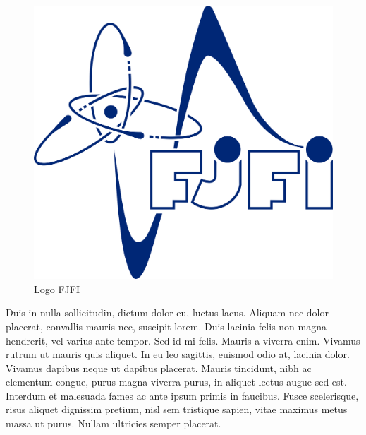 \documentclass{article}
\begin{document}
\begin{figure}[!htp]
	\begin{center}
		\includegraphics[scale=0.1]{logo-fjfi.png}
	\end{center}
	\caption{Logo FJFI}
	\label{fig:logo-fjfi}
\end{figure}

Duis in nulla sollicitudin, dictum dolor eu, luctus lacus. Aliquam nec dolor placerat, convallis mauris nec, suscipit lorem. Duis lacinia felis non magna hendrerit, vel varius ante tempor. Sed id mi felis. Mauris a viverra enim. Vivamus rutrum ut mauris quis aliquet. In eu leo sagittis, euismod odio at, lacinia dolor. Vivamus dapibus neque ut dapibus placerat. Mauris tincidunt, nibh ac elementum congue, purus magna viverra purus, in aliquet lectus augue sed est. Interdum et malesuada fames ac ante ipsum primis in faucibus. Fusce scelerisque, risus aliquet dignissim pretium, nisl sem tristique sapien, vitae maximus metus massa ut purus. Nullam ultricies semper placerat.
\end{document}
